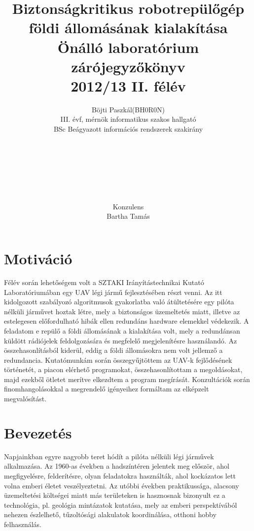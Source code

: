 \documentclass[12pt]{article}
\title{Biztonságkritikus robotrepül\H{o}gép földi állomásának kialakítása\\{\normalsize Önálló laboratórium zárójegyz\H{o}könyv\\2012/13 II. félév}
}
\author{Böjti Paszkál(BH0R0N)\\III. évf, mérnök informatikus szakos hallgató\\
BSc Beágyazott információs rendszerek szakirány
 \\ \\ \\ \\ \\ \\ \\ \\ Konzulens\\Bartha Tamás}
\begin{document}
\maketitle

\tableofcontents


\section{Motiváció}

Félév során lehet\H{o}ségem volt a SZTAKI Irányítástechnikai Kutató Laboratóriumában egy UAV légi járm\H{u} fejlesztésében részt venni. Az itt kidolgozott szabályozó algoritmusok gyakorlatba való átültetésére egy pilóta nélküli járm\H{u}vet hoztak létre, mely a biztonságos üzemeltetés miatt, illetve az estelegesen el\H{o}fordulható hibák ellen redundáns hardware elemekkel védekezik.
A feladatom e repül\H{o} a földi állomásának a kialakítása volt, mely a redundánsan küldött rádiójelek feldolgozására és megfelel\H{o} megjelenítésre használandó. Az összehasonlításból kiderül, eddig a földi állomásokra nem volt jellemz\H{o} a redundancia. Kutatómunkám során összegy\H{u}jtöttem az UAV-k fejl\H{o}désének történetét, a piacon elérhet\H{o} programokat, összehasonlítottam a megoldásokat, majd ezekb\H{o}l ötletet merítve elkezdtem a program megírását. Konzultációk során finomhangolásokkal a megrendel\H{o} igényeihez formáltam az elképzelt megvalósítást.



\section{Bevezetés}

Napjainkban egyre nagyobb teret hódít a pilóta nélküli légi járm\H{u}vek alkalmazása.
Az 1960-as években a hadszíntéren jelentek meg el\H{o}ször, ahol megfigyelésre, felderítésre, olyan feladatokra használták, ahol kockázatos lett volna emberi életet veszélyeztetni.
Az utóbbi években praktikussága, alacsony üzemeltetési költségei miatt más területeken is hasznosnak bizonyult ez a technológia, pl. geológia mintázatok kutatása, mely az emberi perspektívából nehezen észlelhet\H{o}, t\H{u}zoltósági alakulatok koordinálása, otthoni hobby felhasználás. 
\end{document}
